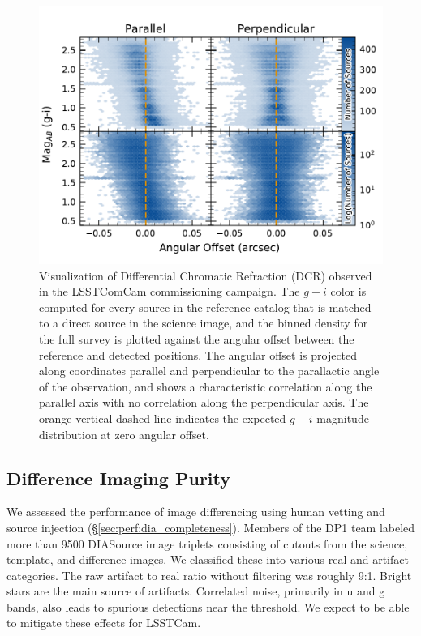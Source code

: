 \begin{figure}[htb!]
\centering
\includegraphics[width=0.98\linewidth]{dcrHexbin.pdf}
\caption{Visualization of \gls{Differential Chromatic Refraction} (DCR) observed in the  LSSTComCam commissioning campaign. The $g-i$ color is computed for every source in the reference catalog that is matched to a direct source in the science image, and the binned density for the full survey is plotted against the angular offset between the reference and detected positions. The angular offset is projected along coordinates parallel and perpendicular to the parallactic angle of the observation, and shows a characteristic correlation along the parallel axis with no correlation along the perpendicular axis. The orange vertical dashed line indicates the expected $g-i$ magnitude distribution at zero angular offset.}
\label{fig:dcr}
\vspace{0.1cm}
\end{figure}


\subsection{Difference Imaging Purity} \label{sec:performance:dia}

We assessed the performance of image differencing using human vetting and source injection (\S \ref{sec:perf:dia_completeness}).
Members of the \gls{DP1} team labeled more than 9500 DIASource image triplets consisting of cutouts from the science, template, and difference images.
We classified these into various real and artifact categories.
The raw artifact to real ratio without filtering was roughly 9:1.
Bright stars are the main source of artifacts.
Correlated noise, primarily in u and g bands, also leads to spurious detections near the threshold.
We expect to be able to mitigate these effects for \gls{LSSTCam}.

